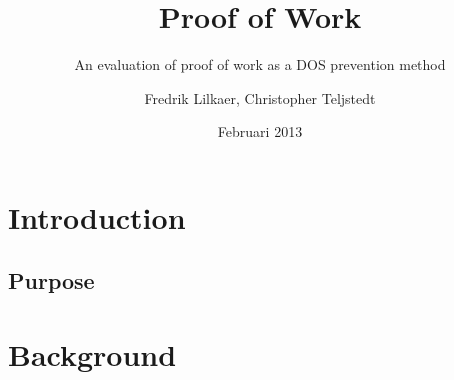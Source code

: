 \documentclass[a4paper,11pt]{kth-mag}
\title{Proof of Work}
\subtitle{An evaluation of proof of work as a DOS prevention method}
\author{Fredrik Lilkaer, Christopher Teljstedt}
\date{Februari 2013}
\begin{document}
\removepagenumbers
\maketitle
{}
\chapter{Introduction}

\section{Purpose}

\chapter{Background}



\begin{comment}
\begin{figure}[ht]
\begin{center}
And here is a figure
\caption{\small{Several statements describing the same resource.}}\label{RDF_4}
\end{center}
\end{figure}


that we refer to here: \ref{RDF_4}
\end{comment}
\end{document}
